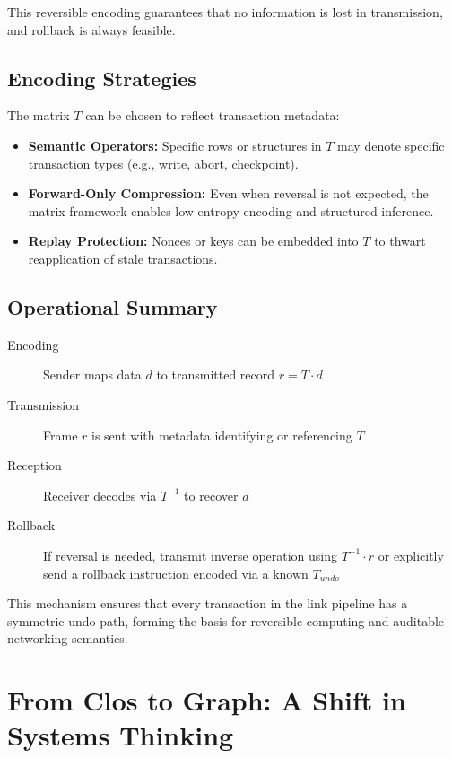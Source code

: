 \documentclass[../../../OAE-SPEC-MAIN.tex]{subfiles}
\begin{document}
This reversible encoding guarantees that no information is lost in transmission, and rollback is always feasible.

\subsection{Encoding Strategies}

The matrix $T$ can be chosen to reflect transaction metadata:
\begin{itemize}
  \item \textbf{Semantic Operators:} Specific rows or structures in $T$ may denote specific transaction types (e.g., write, abort, checkpoint).
  \item \textbf{Forward-Only Compression:} Even when reversal is not expected, the matrix framework enables low-entropy encoding and structured inference.
  \item \textbf{Replay Protection:} Nonces or keys can be embedded into $T$ to thwart reapplication of stale transactions.
\end{itemize}

\subsection{Operational Summary}

\begin{description}
  \item[Encoding] Sender maps data $d$ to transmitted record $r = T \cdot d$
  \item[Transmission] Frame $r$ is sent with metadata identifying or referencing $T$
  \item[Reception] Receiver decodes via $T^{-1}$ to recover $d$
  \item[Rollback] If reversal is needed, transmit inverse operation using $T^{-1} \cdot r$ or explicitly send a rollback instruction encoded via a known $T_{undo}$
\end{description}

This mechanism ensures that every transaction in the link pipeline has a symmetric undo path, forming the basis for reversible computing and auditable networking semantics.




\section{From Clos to Graph: A Shift in Systems Thinking}
\end{document}
